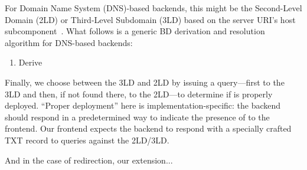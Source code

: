 For Domain Name System (DNS)-based backends, this might be the Second-Level
Domain (2LD) or Third-Level Subdomain (3LD) based on the server URI's host
subcomponent~\cite{RFC3986}. What follows is a generic BD derivation and
resolution algorithm for DNS-based backends:

\begin{enumerate}
    \item Derive 
\end{enumerate}

Finally, we choose between the 3LD and 2LD by issuing a query---first to the 3LD
and then, if not found there, to the 2LD---to determine if \SYSTEM{} is properly
deployed. ``Proper deployment'' here is implementation-specific: the backend
should respond in a predetermined way to indicate the presence of \SYSTEM{} to
the frontend. Our frontend expects the backend to respond with a specially
crafted TXT record to queries against the 2LD/3LD.

And in the case of redirection, our extension...
